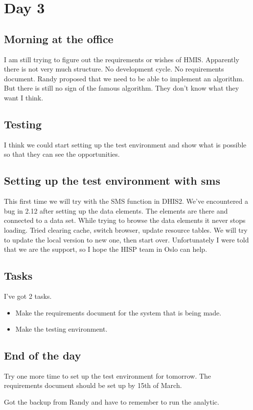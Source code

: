 \section{Day 3}
\subsection{Morning at the office}
I am still trying to figure out the requirements or wishes of HMIS.
Apparently there is not very much structure. No development cycle.
No requirements document. 
Randy proposed that we need to be able to implement an algorithm. 
But there is still no sign of the famous algorithm.
They don't know what they want I think.

\subsection{Testing}
I think we could start setting up the test environment and show what is possible so that they can see the opportunities.

\subsection{Setting up the test environment with sms}
This first time we will try with the SMS function in DHIS2.
We've encountered a bug in 2.12 after setting up the data elements.
The elements are there and connected to a data set.
While trying to browse the data elements it never stops loading.
Tried clearing cache, switch browser, update resource tables.
We will try to update the local version to new one, then start over.
Unfortunately I were told that we are the support, so I hope the HISP team in Oslo can help.

\subsection{Tasks}
I've got 2 tasks.
\begin{itemize}
	\item Make the requirements document for the system that is being made.
	\item Make the testing environment.
\end{itemize}

\subsection{End of the day}
Try one more time to set up the test environment for tomorrow.
The requirements document should be set up by 15th of March.

Got the backup from Randy and have to remember to run the analytic.